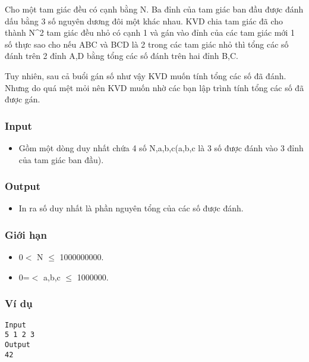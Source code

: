 



   Cho một tam giác đều có cạnh bằng N. Ba đỉnh của tam giác ban đầu được đánh dấu bằng 3 số nguyên dương đôi một khác nhau. KVD chia tam giác đã cho thành N^2 tam giác đều nhỏ có cạnh 1 và gán vào đỉnh của các tam giác mới 1 số thực sao cho nếu ABC và BCD là 2 trong các tam giác nhỏ thì tổng các số đánh trên 2 đỉnh A,D bằng tổng các số đánh trên hai đỉnh B,C.  

   Tuy nhiên, sau cả buổi gán số như vậy KVD muốn tính tổng các số đã đánh. Nhưng do quá mệt mỏi nên KVD muốn nhờ các bạn lập trình tính tổng các số đã được gán.  

\subsubsection{   Input  }
\begin{itemize}
	\item     Gồm một dòng duy nhất chứa 4 số N,a,b,c(a,b,c là 3 số được đánh vào 3 đỉnh của tam giác ban đầu).   
\end{itemize}

\subsubsection{   Output  }
\begin{itemize}
	\item     In ra số duy nhất là phần nguyên tổng của các số được đánh.   
\end{itemize}

\subsubsection{   Giới hạn  }
\begin{itemize}
	\item     0$<$ N  $\le$ 1000000000.   
	\item     0=$<$ a,b,c  $\le$ 1000000.   
\end{itemize}

\subsubsection{   Ví dụ  }
\begin{verbatim}
Input
5 1 2 3
Output
42
\end{verbatim}
